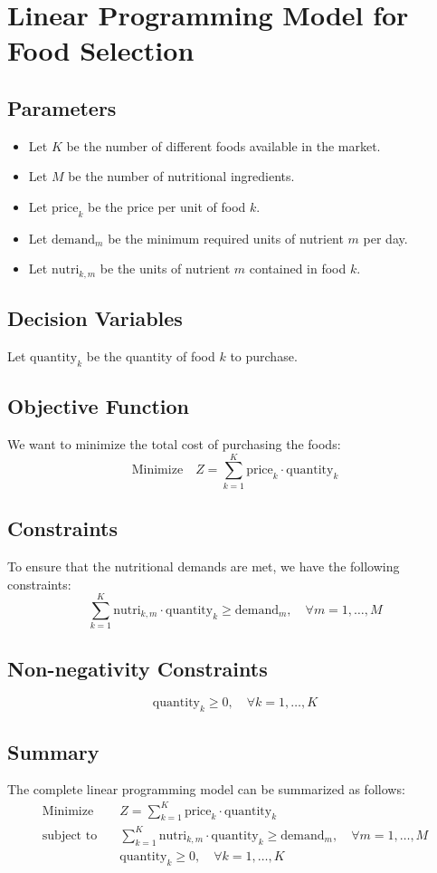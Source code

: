 \documentclass{article}
\begin{document}
\section*{Linear Programming Model for Food Selection}

\subsection*{Parameters}
\begin{itemize}
    \item Let \( K \) be the number of different foods available in the market.
    \item Let \( M \) be the number of nutritional ingredients.
    \item Let \( \text{price}_{k} \) be the price per unit of food \( k \).
    \item Let \( \text{demand}_{m} \) be the minimum required units of nutrient \( m \) per day.
    \item Let \( \text{nutri}_{k, m} \) be the units of nutrient \( m \) contained in food \( k \).
\end{itemize}

\subsection*{Decision Variables}
Let \( \text{quantity}_{k} \) be the quantity of food \( k \) to purchase.

\subsection*{Objective Function}
We want to minimize the total cost of purchasing the foods:
\[
\text{Minimize} \quad Z = \sum_{k=1}^{K} \text{price}_{k} \cdot \text{quantity}_{k}
\]

\subsection*{Constraints}
To ensure that the nutritional demands are met, we have the following constraints:
\[
\sum_{k=1}^{K} \text{nutri}_{k, m} \cdot \text{quantity}_{k} \geq \text{demand}_{m}, \quad \forall m = 1, \ldots, M
\]

\subsection*{Non-negativity Constraints}
\[
\text{quantity}_{k} \geq 0, \quad \forall k = 1, \ldots, K
\]

\subsection*{Summary}
The complete linear programming model can be summarized as follows:
\begin{align*}
\text{Minimize} & \quad Z = \sum_{k=1}^{K} \text{price}_{k} \cdot \text{quantity}_{k} \\
\text{subject to} & \quad \sum_{k=1}^{K} \text{nutri}_{k, m} \cdot \text{quantity}_{k} \geq \text{demand}_{m}, \quad \forall m = 1, \ldots, M \\
& \quad \text{quantity}_{k} \geq 0, \quad \forall k = 1, \ldots, K
\end{align*}
\end{document}
